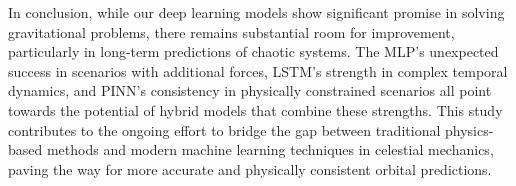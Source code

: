 \documentclass[11pt,a4paper, twocolumn]{article}
\begin{document}
In conclusion, while our deep learning models show significant promise in solving gravitational problems, there remains substantial room for improvement, particularly in long-term predictions of chaotic systems. The MLP's unexpected success in scenarios with additional forces, LSTM's strength in complex temporal dynamics, and PINN's consistency in physically constrained scenarios all point towards the potential of hybrid models that combine these strengths. This study contributes to the ongoing effort to bridge the gap between traditional physics-based methods and modern machine learning techniques in celestial mechanics, paving the way for more accurate and physically consistent orbital predictions.




\onecolumn
\appendix
\end{document}
